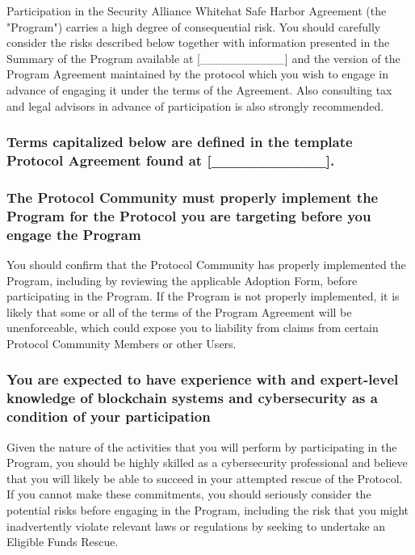 Participation in the Security Alliance Whitehat Safe Harbor Agreement (the "Program") carries a high degree of consequential risk. You should carefully consider the risks described below together with information presented in the Summary of the Program available at [\_\_\_\_\_\_\_\_\_\_] and the version of the Program Agreement maintained by the protocol which you wish to engage in advance of engaging it under the terms of the Agreement. Also consulting tax and legal advisors in advance of participation is also strongly recommended.

\subsubsection*{Terms capitalized below are defined in the template Protocol Agreement found at [\_\_\_\_\_\_\_\_\_\_].}

\subsubsection*{The Protocol Community must properly implement the Program for the Protocol you are targeting before you engage the Program}\label{exhibit:e:implementation}

You should confirm that the Protocol Community has properly implemented the Program, including by reviewing the applicable Adoption Form, before participating in the Program. If the Program is not properly implemented, it is likely that some or all of the terms of the Program Agreement will be unenforceable, which could expose you to liability from claims from certain Protocol Community Members or other Users.

\subsubsection*{You are expected to have experience with and expert-level knowledge of blockchain systems and cybersecurity as a condition of your participation}\label{exhibit:e:expertise}

Given the nature of the activities that you will perform by participating in the Program, you should be highly skilled as a cybersecurity professional and believe that you will likely be able to succeed in your attempted rescue of the Protocol. If you cannot make these commitments, you should seriously consider the potential risks before engaging in the Program, including the risk that you might inadvertently violate relevant laws or regulations by seeking to undertake an Eligible Funds Rescue.

